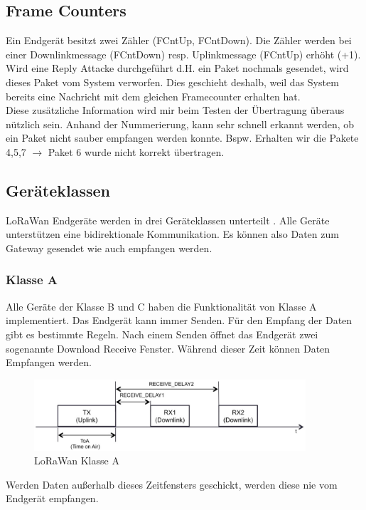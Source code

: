\documentclass[11pt,english,german]{report}
\theoremstyle{definition}
\begin{document}
\subsection{Frame Counters}
Ein Endgerät besitzt zwei Zähler (FCntUp, FCntDown). Die Zähler werden bei einer Downlinkmessage (FCntDown) resp. Uplinkmessage (FCntUp) erhöht (+1).\\[0.3cm]
Wird eine Reply Attacke durchgeführt d.H. ein Paket nochmals gesendet, wird dieses Paket vom System verworfen. Dies geschieht deshalb, weil das System bereits eine Nachricht mit dem gleichen Framecounter erhalten hat.\\[0.3cm]
Diese zusätzliche Information wird mir beim Testen der Übertragung überaus nützlich sein. Anhand der Nummerierung, kann sehr schnell erkannt werden, ob ein Paket nicht sauber empfangen werden konnte. Bspw. Erhalten wir die Pakete 4,5,7 $\rightarrow$ Paket 6 wurde nicht korrekt übertragen.

\newpage
\subsection{Geräteklassen}
LoRaWan Endgeräte werden in drei Geräteklassen unterteilt \cite{lorawan_classes}. Alle Geräte unterstützen eine bidirektionale Kommunikation. Es können also Daten zum Gateway gesendet wie auch empfangen werden.
\subsubsection{Klasse A}
Alle Geräte der Klasse B und C haben die Funktionalität von Klasse A implementiert. Das Endgerät kann immer Senden. Für den Empfang der Daten gibt es bestimmte Regeln. Nach einem Senden öffnet das Endgerät zwei sogenannte Download Receive Fenster. Während dieser Zeit können Daten Empfangen werden. 

\begin{figure}[H]
	\centering
	\includegraphics[width=0.9\textwidth]{img/lora/lorawan_class_a.png}
	\caption[LoRaWan Klasse A]
	{LoRaWan Klasse A}
\end{figure}
\noindent
Werden Daten außerhalb dieses Zeitfensters geschickt, werden diese nie vom Endgerät empfangen.
\end{document}
